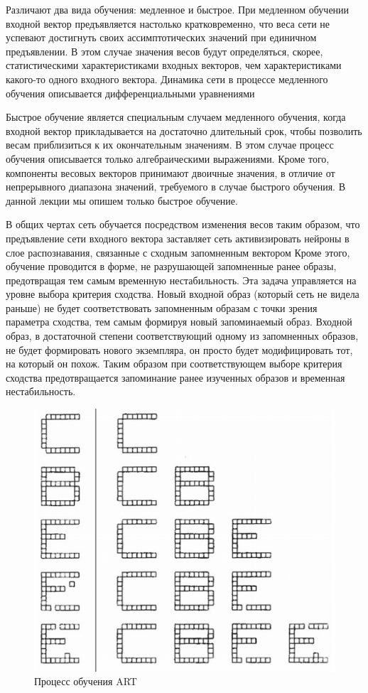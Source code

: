 \documentclass[14pt,a4paper,report]{article}
\begin{document}
Различают два вида обучения: медленное и быстрое. При медленном обучении входной вектор предъявляется настолько кратковременно, что веса сети не успевают достигнуть своих ассимптотических значений при единичном предъявлении. В этом случае значения весов будут определяться, скорее, статистическими характеристиками входных векторов, чем характеристиками какого-то одного входного вектора. Динамика сети в процессе медленного обучения описывается дифференциальными уравнениями \cite{cite-kgeu-adapt}

Быстрое обучение является специальным случаем медленного обучения, когда входной вектор прикладывается на достаточно длительный срок, чтобы позволить весам приблизиться к их окончательным значениям. В этом случае процесс обучения описывается только алгебраическими выражениями. Кроме того, компоненты весовых векторов принимают двоичные значения, в отличие от непрерывного диапазона значений, требуемого в случае быстрого обучения. В данной лекции мы опишем только быстрое обучение. 

В общих чертах сеть обучается посредством изменения весов таким образом, что предъявление сети входного вектора заставляет сеть активизировать нейроны в слое распознавания, связанные с сходным запомненным вектором \cite{cite-techn-adapt} Кроме этого, обучение проводится в форме, не разрушающей запомненные ранее образы, предотвращая тем самым временную нестабильность. Эта задача управляется на уровне выбора критерия сходства. Новый входной образ (который сеть не видела раньше) не будет соответствовать запомненным образам с точки зрения параметра сходства, тем самым формируя новый запоминаемый образ. Входной образ, в достаточной степени соответствующий одному из запомненных образов, не будет формировать нового экземпляра, он просто будет модифицировать тот, на который он похож. Таким образом при соответствующем выборе критерия сходства предотвращается запоминание ранее изученных образов и временная нестабильность.

\begin{figure}[h!]
	\centering
	\includegraphics[scale = 0.60]{images/6.png}
	\caption{Процесс обучения ART}
	\label{art-study}
\end{figure}
\end{document}
